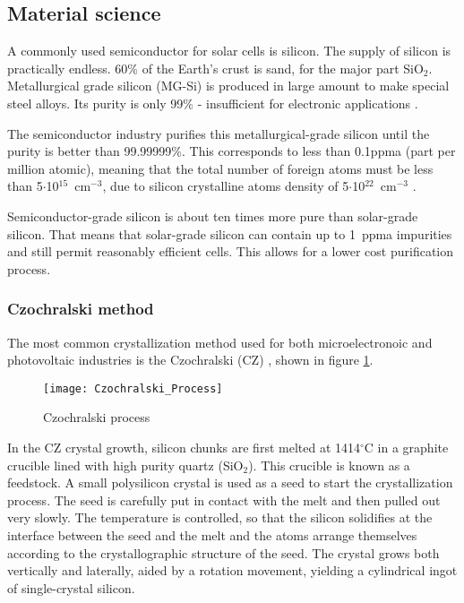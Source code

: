 \subsection{Material science}

A commonly used semiconductor for solar cells is silicon. The supply of silicon is practically endless. 60\% of the Earth's crust is sand, for the major part SiO$_2$. Metallurgical grade silicon (MG-Si) is produced in large amount to make special steel alloys. Its purity is only 99\% - insufficient for electronic applications \cite{solar_cells}. 

The semiconductor industry purifies this metallurgical-grade silicon until the purity is better than 99.99999\%. This corresponds to less than 0.1ppma (part per million atomic), meaning that the total number of foreign atoms must be less than 5$\cdot$10${^15}$~cm$^{-3}$, due to silicon crystalline atoms density of 5$\cdot$10$^{22}$~cm$^{-3}$ \cite{solar_cells}.

Semiconductor-grade silicon is about ten times more pure than solar-grade silicon. That means that solar-grade silicon can contain up to 1~ppma impurities and still permit reasonably efficient cells. This allows for a lower cost purification process.

\subsubsection{Czochralski method}

The most common crystallization method used for both microelectronoic and photovoltaic industries is the Czochralski (CZ) \cite{solar_cells},  shown in figure \ref{fig:czochralski_process}.

\begin{figure}[H]
\texttt{[image: Czochralski\_Process]}%
\caption{Czochralski process}%
\label{fig:czochralski_process}%
\end{figure}

In the CZ crystal growth, silicon chunks are first melted at 1414$^\circ$C in a graphite crucible lined with high purity quartz (SiO$_2$). This crucible is known as a feedstock. A small polysilicon crystal is used as a seed to start the crystallization process. The seed is carefully put in contact with the melt and then pulled out very slowly. The temperature is controlled, so that the silicon solidifies at the interface between the seed and the melt and the atoms arrange themselves according to the crystallographic structure of the seed. The crystal grows both vertically and laterally, aided by a rotation movement, yielding a cylindrical ingot of single-crystal silicon. 

